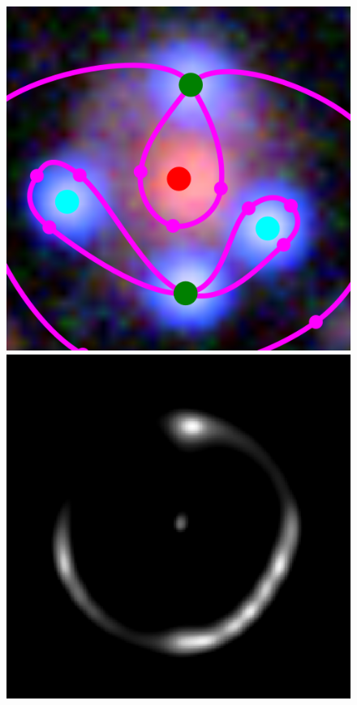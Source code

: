 \documentclass[usenatbib]{mn2e}
\newlength{\myplotswidth}
\begin{document}
\begin{figure}
  \centering


  \includegraphics[width=\myplotswidth]{fig/007022_input}
  \includegraphics[width=\myplotswidth]{fig/007022_arr_time_ipol} \\

\end{figure}
\end{document}
